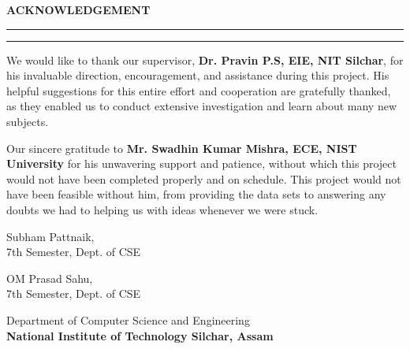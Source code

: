 \newpage
\thispagestyle{empty}

\begin{center}
\textbf{\LARGE{ACKNOWLEDGEMENT}}
\vspace{.1in}\hrule
\vspace{.05in}\hrule
\vspace{.4in}
\end{center}

\begin{justifying}
We would like to thank our supervisor, \textbf{Dr. Pravin P.S, EIE, NIT Silchar}, for his invaluable direction, encouragement, and assistance during this project. His helpful suggestions for this entire effort and cooperation are gratefully thanked, as they enabled us to conduct extensive investigation and learn about many new subjects.

\vspace{0.5in}

Our sincere gratitude to \textbf{Mr. Swadhin Kumar Mishra, ECE, NIST University} for his unwavering support and patience, without which this project would not have been completed properly and on schedule. This project would not have been feasible without him, from providing the data sets to answering any doubts we had to helping us with ideas whenever we were stuck.
\end{justifying}

\vspace{1in}

\begin{flushright}
\begin{minipage}{2in}
    \begin{center}
    
        Subham Pattnaik, \\
        7th Semester, Dept. of CSE
        
        \vspace{0.5in}
        
        OM Prasad Sahu, \\
        7th Semester, Dept. of CSE
        
    \end{center}
\end{minipage}
\end{flushright}

\begin{center}
\vspace{1.5in}
Department of Computer Science and Engineering\\
\textbf{National Institute of Technology Silchar, Assam}
\end{center}
